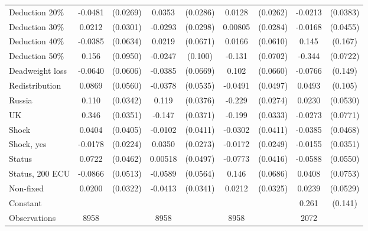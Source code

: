 \begin{tabular}{l|cccccc|cc}
Deduction 20\%&  -0.0481\sym{*}  & (0.0269)&   0.0353         & (0.0286)&   0.0128         & (0.0262)&  -0.0213         & (0.0383)\\
Deduction 30\%&   0.0212         & (0.0301)&  -0.0293         & (0.0298)&  0.00805         & (0.0284)&  -0.0168         & (0.0455)\\
Deduction 40\%&  -0.0385         & (0.0634)&   0.0219         & (0.0671)&   0.0166         & (0.0610)&    0.145         &  (0.167)\\
Deduction 50\%&    0.156         & (0.0950)&  -0.0247         &  (0.100)&   -0.131\sym{*}  & (0.0702)&   -0.344\sym{***}& (0.0722)\\
Deadweight loss&  -0.0640         & (0.0606)&  -0.0385         & (0.0669)&    0.102         & (0.0660)&  -0.0766         &  (0.149)\\
Redistribution&   0.0869         & (0.0560)&  -0.0378         & (0.0535)&  -0.0491         & (0.0497)&   0.0493         &  (0.105)\\
Russia        &    0.110\sym{***}& (0.0342)&    0.119\sym{***}& (0.0376)&   -0.229\sym{***}& (0.0274)&   0.0230         & (0.0530)\\
UK            &    0.346\sym{***}& (0.0351)&   -0.147\sym{***}& (0.0371)&   -0.199\sym{***}& (0.0333)&  -0.0273         & (0.0771)\\
Shock         &   0.0404         & (0.0405)&  -0.0102         & (0.0411)&  -0.0302         & (0.0411)&  -0.0385         & (0.0468)\\
Shock, yes    &  -0.0178         & (0.0224)&   0.0350         & (0.0273)&  -0.0172         & (0.0249)&  -0.0155         & (0.0351)\\
Status        &   0.0722         & (0.0462)&  0.00518         & (0.0497)&  -0.0773\sym{*}  & (0.0416)&  -0.0588         & (0.0550)\\
Status, 200 ECU&  -0.0866\sym{*}  & (0.0513)&  -0.0589         & (0.0564)&    0.146\sym{**} & (0.0686)&   0.0408         & (0.0753)\\
Non-fixed     &   0.0200         & (0.0322)&  -0.0413         & (0.0341)&   0.0212         & (0.0325)&   0.0239         & (0.0529)\\
Constant        &                  &         &                  &         &                  &         &    0.261\sym{*}  &  (0.141)\\
\hline
Observations    &     8958         &         &     8958         &         &     8958         &         &     2072         &         \\

\end{tabular}
